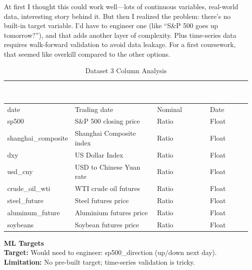 \documentclass[11pt,a4paper]{article}
\begin{document}
At first I thought this could work well—lots of continuous variables, real-world data, 
interesting story behind it. But then I realized the problem: there's no built-in target 
variable. I'd have to engineer one (like ``S\&P 500 goes up tomorrow?''), and that adds 
another layer of complexity. Plus time-series data requires walk-forward validation to avoid 
data leakage. For a first coursework, that seemed like overkill compared to the other options.

\vspace{0.3cm}
\begin{table}[H]
\centering
\caption{Dataset 3 Column Analysis}
\small
\begin{tabular}{L{3.5cm} L{5cm} L{2cm} L{2cm}}
\toprule
{}
\textcolor{white}{\textbf{Column Name}} &
\textcolor{white}{\textbf{Description}} &
\textcolor{white}{\textbf{Measurement}} &
\textcolor{white}{\textbf{Data Type}} \\
\midrule
date                 & Trading date                   & Nominal & Date  \\
sp500                & S\&P 500 closing price         & Ratio   & Float \\
shanghai\_composite  & Shanghai Composite index       & Ratio   & Float \\
dxy                  & US Dollar Index                & Ratio   & Float \\
usd\_cny             & USD to Chinese Yuan rate       & Ratio   & Float \\
crude\_oil\_wti      & WTI crude oil futures          & Ratio   & Float \\
steel\_future        & Steel futures price            & Ratio   & Float \\
aluminum\_future     & Aluminium futures price        & Ratio   & Float \\
soybeans             & Soybean futures price          & Ratio   & Float \\
\bottomrule
\end{tabular}
\end{table}

\begin{mlbox}
\textbf{\color{black} ML Targets}\\
\textbf{Target:} Would need to engineer: sp500\_direction (up/down next day).\\
\textbf{Limitation:} No pre-built target; time-series validation is tricky.
\end{mlbox}
\end{document}
